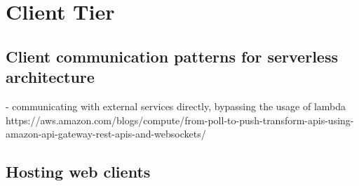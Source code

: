 \section{Client Tier}

\subsection{Client communication patterns for serverless architecture}

- communicating with external services directly, bypassing the usage of lambda
https://aws.amazon.com/blogs/compute/from-poll-to-push-transform-apis-using-amazon-api-gateway-rest-apis-and-websockets/

\subsection{Hosting web clients}

